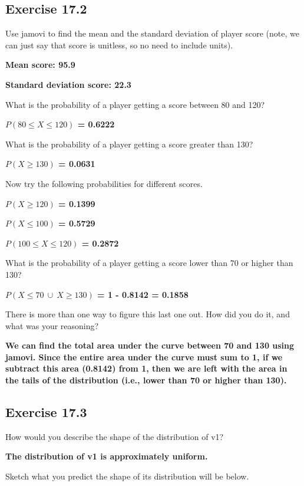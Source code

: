 \documentclass[
]{scrbook}
\begin{document}
\hypertarget{exercise-17.2}{%
\subsection{Exercise 17.2}\label{exercise-17.2}}

Use jamovi to find the mean and the standard deviation of player score (note, we can just say that score is unitless, so no need to include units).

\textbf{Mean score: 95.9}

\textbf{Standard deviation score: 22.3}

What is the probability of a player getting a score between 80 and 120?

\textbf{\(P(80 \leq X \leq 120)\) = 0.6222}

What is the probability of a player getting a score greater than 130?

\textbf{\(P(X \geq 130)\) = 0.0631}

Now try the following probabilities for different scores.

\textbf{\(P(X \geq 120)\) = 0.1399}

\textbf{\(P(X \leq 100)\) = 0.5729}

\textbf{\(P(100 \leq X \leq 120)\) = 0.2872}

What is the probability of a player getting a score lower than 70 or higher than 130?

\textbf{\(P(X \leq 70 \: \cup \: X \geq 130)\) = 1 - 0.8142 = 0.1858}

There is more than one way to figure this last one out. How did you do it, and what was your reasoning?

\textbf{We can find the total area under the curve between 70 and 130 using jamovi. Since the entire area under the curve must sum to 1, if we subtract this area (0.8142) from 1, then we are left with the area in the tails of the distribution (i.e., lower than 70 or higher than 130).}

\hypertarget{exercise-17.3}{%
\subsection{Exercise 17.3}\label{exercise-17.3}}

How would you describe the shape of the distribution of v1?

\textbf{The distribution of v1 is approximately uniform.}

Sketch what you predict the shape of its distribution will be below.
\end{document}
